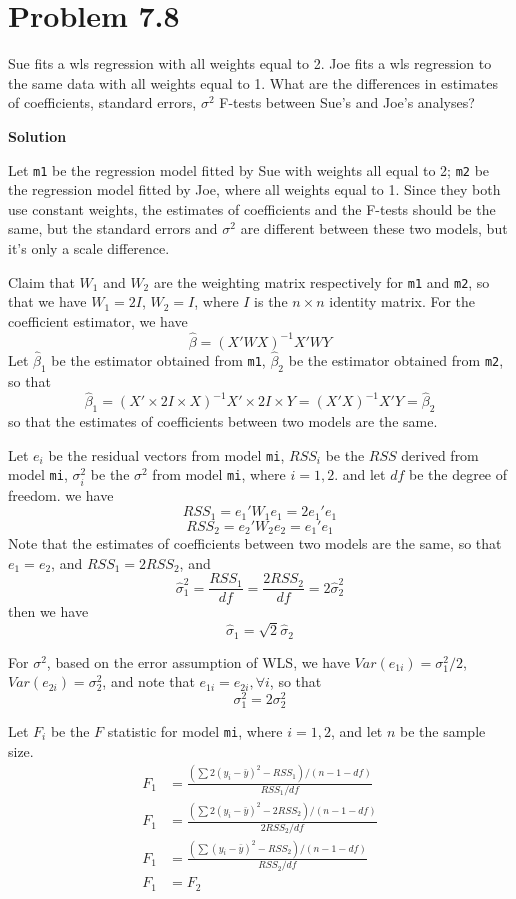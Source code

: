 \documentclass[12pt,oneside,a4paper]{article}\usepackage[]{graphicx}\usepackage[]{xcolor}
\title{\hmwkTitle}
\author{\hmwkAuthorName}
\date{\today}
\newcommand{\problem}[1]
{
    \clearpage
    \section*{Problem {#1}}
}
\newcommand{\solution}
{
    \vspace{15pt}
    \noindent\ignorespaces\textbf{\large Solution}\par
}
\newcommand{\m}[1]{\texttt{{#1}}}
\begin{document}
\maketitle



\problem{7.8}
Sue fits a wls regression with all weights equal to 2. Joe fits a wls regression to the same data with all weights equal to 1. What are the differences in estimates of coefficients, standard errors, $\sigma^{2}$ F-tests between Sue’s and Joe’s analyses?

\solution
Let \m{m1} be the regression model fitted by Sue with weights all equal to 2; \m{m2} be the regression model fitted by Joe, where all weights equal to 1. Since they both use constant weights, the estimates of coefficients and the F-tests should be the same, but the standard errors and $\sigma^{2}$ are different between these two models, but it's only a scale difference.

Claim that $W_{1}$ and $W_{2}$ are the weighting matrix respectively for \m{m1} and \m{m2}, so that we have $W_{1} = 2I$, $W_{2} = I$, where $I$ is the $n\times n$ identity matrix. For the coefficient estimator, we have 
$$\hat{\beta} = (X'WX)^{-1}X'WY$$
Let $\hat{\beta}_{1}$ be the estimator obtained from \m{m1}, $\hat{\beta}_{2}$ be the estimator obtained from \m{m2}, so that 
$$\hat{\beta}_{1} = (X' \times 2I \times X)^{-1}X'\times 2I \times Y = (X'X)^{-1}X'Y = \hat{\beta}_{2}$$
so that the estimates of coefficients between two models are the same.

Let $e_{i}$ be the residual vectors from model \m{mi}, $RSS_{i}$ be the $RSS$ derived from model \m{mi}, $\sigma^{2}_{i}$ be the $\sigma^{2}$ from model \m{mi}, where $i = 1,2$. and let $df$ be the degree of freedom. we have
$$RSS_{1} = e_{1}'W_{1}e_{1} = 2e_{1}'e_{1}$$
$$RSS_{2} = e_{2}'W_{2}e_{2} = e_{1}'e_{1}$$
Note that the estimates of coefficients between two models are the same, so that $e_{1} = e_{2}$, and $RSS_{1} = 2RSS_{2}$, and
$$\hat{\sigma}_{1}^{2} = \frac{RSS_{1}}{df} = \frac{2RSS_{2}}{df} = 2\hat{\sigma}_{2}^{2}$$
then we have
$$\hat{\sigma}_{1} = \sqrt{2}\hat{\sigma}_{2}$$

For $\sigma^{2}$, based on the error assumption of WLS, we have $Var(e_{1i}) = \sigma_{1}^{2} / 2$, $Var(e_{2i}) = \sigma_{2}^{2}$, and note that $e_{1i} = e_{2i}, \forall i$, so that $$\sigma_{1}^{2} = 2\sigma_{2}^{2}$$

Let $F_{i}$ be the $F$ statistic for model \m{mi}, where $i=1,2$, and let $n$ be the sample size.
$$\begin{aligned}
F_{1} &= \frac{(\sum{2(y_{i} - \bar{y})^2} - RSS_{1}) / (n - 1 - df)}{RSS_{1}/df}\\
F_{1} &= \frac{(\sum{2(y_{i} - \bar{y})^2} - 2RSS_{2}) / (n - 1 - df)}{2RSS_{2}/df}\\
F_{1} &= \frac{(\sum{(y_{i} - \bar{y})^2} - RSS_{2}) / (n - 1 - df)}{RSS_{2}/df}\\
F_{1} &= F_{2}
\end{aligned}$$
\end{document}
